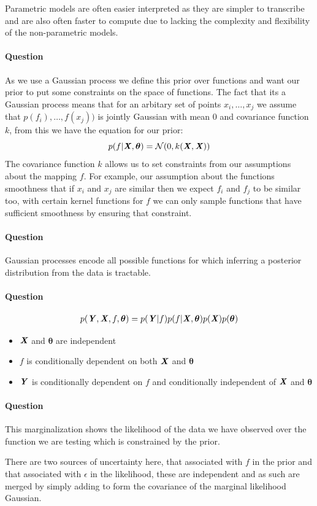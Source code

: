 \documentclass{article}
\newcounter{question}
\newcommand{\question}{\stepcounter{question}\paragraph{Question \thequestion}}
\newcommand{\mat}[1]{\textbf{\textit{#1}}}
\begin{document}
Parametric models are often easier interpreted as they are simpler to transcribe and are also often faster to compute due to lacking the complexity and flexibility of the non-parametric models.
\question As we use a Gaussian process we define this prior over functions and want our prior to put some constraints on the space of functions. The fact that its a Gaussian process means that for an arbitary set of points $x_i, \ldots, x_j$ we assume that $p(f_i), \ldots,f(x_j))$ is jointly Gaussian with mean $0$ and covariance function $k$, from this we have the equation for our prior:
$$
	p(f|\mat{X},\bm{\theta}) = \mathcal{N}(0, k(\mat{X},\mat{X}))
$$
The covariance function $k$ allows us to set constraints from our assumptions about the mapping $f$. For example, our assumption about the functions smoothness that if $x_i$ and $x_j$ are similar then we expect $f_i$ and $f_j$ to be similar too, with certain kernel functions for $f$ we can only sample functions that have sufficient smoothness by ensuring that constraint.
\question Gaussian processes encode all possible functions for which inferring a posterior distribution from the data is tractable.
\question
\begin{align*}
	p(\mat{Y},\mat{X},f,\bm{\theta}) = p(\mat{Y}|f)p(f|\mat{X},\bm{\theta})p(\mat{X})p(\bm{\theta})
\end{align*}
\begin{center}
\end{center}
\begin{itemize}
	\item $\mat{X}$ and $\bm{\theta}$ are independent
	\item $f$ is conditionally dependent on both $\mat{X}$ and $\bm{\theta}$
	\item $\mat{Y}$ is conditionally dependent on $f$ and conditionally independent of $\mat{X}$ and $\bm{\theta}$
\end{itemize}
\question This marginalization shows the likelihood of the data we have observed over the function we are testing which is constrained by the prior.

There are two sources of uncertainty here, that associated with $f$ in the prior and that associated with $\epsilon$ in the likelihood, these are independent and as such are merged by simply adding to form the covariance of the marginal likelihood Gaussian.
\end{document}
